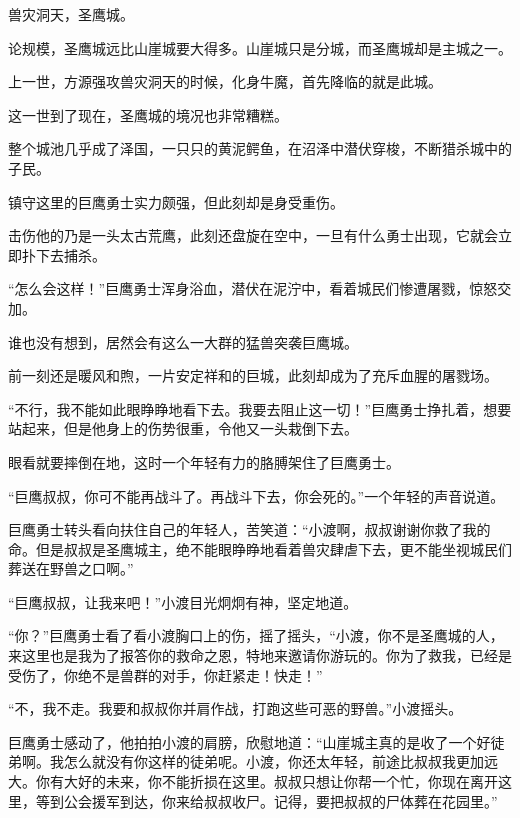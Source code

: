 
\begin{this_body}



兽灾洞天，圣鹰城。

论规模，圣鹰城远比山崖城要大得多。山崖城只是分城，而圣鹰城却是主城之一。

上一世，方源强攻兽灾洞天的时候，化身牛魔，首先降临的就是此城。

这一世到了现在，圣鹰城的境况也非常糟糕。

整个城池几乎成了泽国，一只只的黄泥鳄鱼，在沼泽中潜伏穿梭，不断猎杀城中的子民。

镇守这里的巨鹰勇士实力颇强，但此刻却是身受重伤。

击伤他的乃是一头太古荒鹰，此刻还盘旋在空中，一旦有什么勇士出现，它就会立即扑下去捕杀。

“怎么会这样！”巨鹰勇士浑身浴血，潜伏在泥泞中，看着城民们惨遭屠戮，惊怒交加。

谁也没有想到，居然会有这么一大群的猛兽突袭巨鹰城。

前一刻还是暖风和煦，一片安定祥和的巨城，此刻却成为了充斥血腥的屠戮场。

“不行，我不能如此眼睁睁地看下去。我要去阻止这一切！”巨鹰勇士挣扎着，想要站起来，但是他身上的伤势很重，令他又一头栽倒下去。

眼看就要摔倒在地，这时一个年轻有力的胳膊架住了巨鹰勇士。

“巨鹰叔叔，你可不能再战斗了。再战斗下去，你会死的。”一个年轻的声音说道。

巨鹰勇士转头看向扶住自己的年轻人，苦笑道：“小渡啊，叔叔谢谢你救了我的命。但是叔叔是圣鹰城主，绝不能眼睁睁地看着兽灾肆虐下去，更不能坐视城民们葬送在野兽之口啊。”

“巨鹰叔叔，让我来吧！”小渡目光炯炯有神，坚定地道。

“你？”巨鹰勇士看了看小渡胸口上的伤，摇了摇头，“小渡，你不是圣鹰城的人，来这里也是我为了报答你的救命之恩，特地来邀请你游玩的。你为了救我，已经是受伤了，你绝不是兽群的对手，你赶紧走！快走！”

“不，我不走。我要和叔叔你并肩作战，打跑这些可恶的野兽。”小渡摇头。

巨鹰勇士感动了，他拍拍小渡的肩膀，欣慰地道：“山崖城主真的是收了一个好徒弟啊。我怎么就没有你这样的徒弟呢。小渡，你还太年轻，前途比叔叔我更加远大。你有大好的未来，你不能折损在这里。叔叔只想让你帮一个忙，你现在离开这里，等到公会援军到达，你来给叔叔收尸。记得，要把叔叔的尸体葬在花园里。”


\end{this_body}
